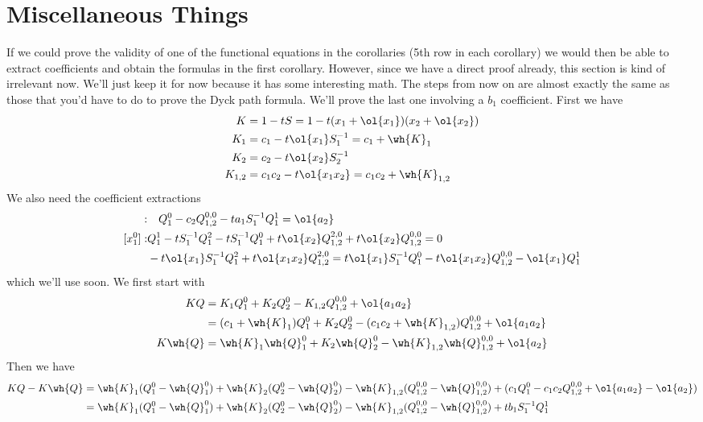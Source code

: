 
\section{Miscellaneous Things}

If we could prove the validity of one of the functional equations in the corollaries (5th row in each corollary) we would then be able to extract coefficients and obtain the formulas in the first corollary. However, since we have a direct proof already, this section is kind of irrelevant now. We'll just keep it for now because it has some interesting math. The steps from now on are almost exactly the same as those that you'd have to do to prove the Dyck path formula. We'll prove the last one involving a $b_1$ coefficient. First we have
\begin{align}
   K &= 1 - tS = 1 - t(x_1+\ol{x_1})(x_2+\ol{x_2})\\
   K_1 &= c_1 - t \ol{x_1} S_1^{-1} = c_1 + \wh{K}_1\\
   K_2 &= c_2 - t \ol{x_2} S_2^{-1}\\
   K_{1,2} &= c_1c_2 - t\ol{x_1x_2} = c_1c_2+\wh{K}_{1,2}
\end{align}
We also need the coefficient extractions
\begin{align}[x_1^0]:&\quad Q_1^0 - c_2Q_{1,2}^{0,0}-ta_1S_1^{-1}Q_1^1 =\ol{a_2}\\
[x_1^0]: &Q_1^1-tS_1^{-1}Q_1^2-tS_1^{-1}Q_1^0+ t \ol{x_2}Q_{1,2}^{2,0}+t\ol{x_2}Q_{1,2}^{0,0} = 0\\
                &-t\ol{x_1}S_1^{-1}Q_1^2+t\ol{x_1x_2}Q_{1,2}^{2,0} = t\ol{x_1}S_1^{-1}Q_1^0-t\ol{x_1x_2}Q_{1,2}^{0,0}-\ol{x_1}Q_1^1
\end{align}
which we'll use soon. We first start with
\begin{align}
KQ &= K_1Q_1^0 + K_2 Q_2^0-K_{1,2}Q_{1,2}^{0,0} + \ol{a_1a_2}\\ 
      &= (c_1+\wh{K}_1)Q_1^0 + K_2 Q_2^0-(c_1c_2+\wh{K}_{1,2})Q_{1,2}^{0,0} + \ol{a_1a_2}\\
K\wh{Q} &=\wh{K}_1\wh{Q}_1^0 + K_2 \wh{Q}_2^0-\wh{K}_{1,2}\wh{Q}_{1,2}^{0,0} + \ol{a_2}
\end{align}
Then we have
\begin{align}
KQ-K\wh{Q} &= \wh{K}_1(Q_1^0-\wh{Q}_1^0)+\wh{K}_2(Q_2^0-\wh{Q}_2^0)-\wh{K}_{1,2}(Q_{1,2}^{0,0}-\wh{Q}_{1,2}^{0,0})+(c_1Q_1^0-c_1c_2Q_{1,2}^{0,0}+\ol{a_1a_2}-\ol{a_2})\\
                     &=\wh{K}_1(Q_1^0-\wh{Q}_1^0)+\wh{K}_2(Q_2^0-\wh{Q}_2^0)-\wh{K}_{1,2}(Q_{1,2}^{0,0}-\wh{Q}_{1,2}^{0,0}) + tb_1S_1^{-1}Q_1^1
\end{align}
